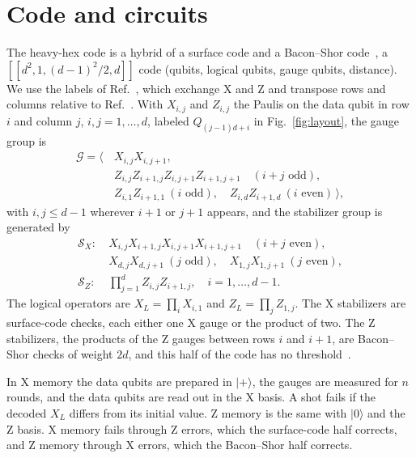 \documentclass[aps,pra,reprint,nofootinbib,longbibliography,floatfix,showkeys]{revtex4-2}
\newcommand{\ket}[1]{\lvert #1\rangle}
\begin{document}
\section{Code and circuits}
\label{sec:code}

The heavy-hex code is a hybrid of a surface code and a Bacon--Shor code~\cite{chamberland2020topological,bacon2006operator}, a $[[d^2,1,(d-1)^2/2,d]]$ code (qubits, logical qubits, gauge qubits, distance).
We use the labels of Ref.~\cite{sundaresan2023demonstrating}, which exchange X and Z and transpose rows and columns relative to Ref.~\cite{chamberland2020topological}.
With $X_{i,j}$ and $Z_{i,j}$ the Paulis on the data qubit in row $i$ and column $j$, $i,j = 1,\ldots,d$, labeled $Q_{(j-1)d+i}$ in Fig.~\ref{fig:layout}, the gauge group is
\begin{equation}
\begin{aligned}
\mathcal{G} = \bigl\langle\, & X_{i,j}X_{i,j+1},\\
& Z_{i,j}Z_{i+1,j}Z_{i,j+1}Z_{i+1,j+1} \quad (i+j \text{ odd}),\\
& Z_{i,1}Z_{i+1,1} \ (i \text{ odd}),\quad Z_{i,d}Z_{i+1,d} \ (i \text{ even}) \,\bigr\rangle ,
\end{aligned}
\label{eq:gauges}
\end{equation}
with $i, j \le d-1$ wherever $i+1$ or $j+1$ appears, and the stabilizer group is generated by
\begin{equation}
\begin{aligned}
\mathcal{S}_X:\ & X_{i,j}X_{i+1,j}X_{i,j+1}X_{i+1,j+1} \quad (i+j \text{ even}),\\
& X_{d,j}X_{d,j+1} \ (j \text{ odd}),\quad X_{1,j}X_{1,j+1} \ (j \text{ even}),\\
\mathcal{S}_Z:\ & \textstyle\prod_{j=1}^{d} Z_{i,j}Z_{i+1,j}, \quad i = 1, \ldots, d-1 .
\end{aligned}
\label{eq:stabilizers}
\end{equation}
The logical operators are $X_L = \prod_{i} X_{i,1}$ and $Z_L = \prod_{j} Z_{1,j}$.
The X stabilizers are surface-code checks, each either one X gauge or the product of two.
The Z stabilizers, the products of the Z gauges between rows $i$ and $i+1$, are Bacon--Shor checks of weight $2d$, and this half of the code has no threshold~\cite{chamberland2020topological,napp2013optimal}.

In X memory the data qubits are prepared in $\ket{+}$, the gauges are measured for $n$ rounds, and the data qubits are read out in the X basis.
A shot fails if the decoded $X_L$ differs from its initial value.
Z memory is the same with $\ket{0}$ and the Z basis.
X memory fails through Z errors, which the surface-code half corrects, and Z memory through X errors, which the Bacon--Shor half corrects.
\end{document}
